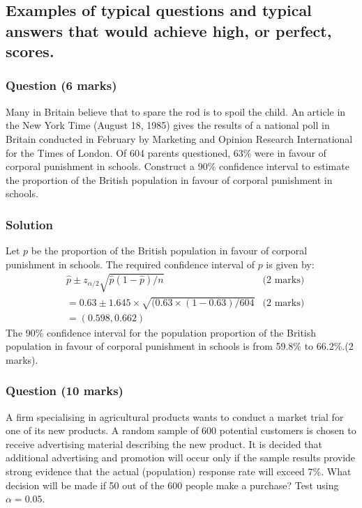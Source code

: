 \documentclass[a4paper,oneside]{book}
\begin{document}
\subsection*{Examples of typical questions and typical answers that
  would achieve high, or perfect, scores.}





\subsubsection*{Question (6 marks)}

Many in Britain believe that to spare the rod is to spoil the
child. An article in the New York Time (August 18, 1985) gives the
results of a national poll in Britain conducted in February by
Marketing and Opinion Research International for the Times of
London. Of 604 parents questioned, 63\% were in favour of corporal
punishment in schools. Construct a 90\% confidence interval to
estimate the proportion of the British population in favour of
corporal punishment in schools.

\subsubsection*{Solution}
Let $p$ be the proportion of the British population in favour of corporal punishment in
schools. The required confidence interval of $p$ is given by:
\begin{align*}
  & \hat{p} \pm z_{\alpha/2}\sqrt{\hat{p}(1-\hat{p})/n}  & \text{(2 marks)}\\
  & = 0.63\pm 1.645\times \sqrt{(0.63\times (1-0.63)/604}  & \text{(2 marks)}\\
  & = (0.598,0.662)
\end{align*}
The 90\% confidence interval for the population proportion of the British population in favour of
corporal punishment in schools is from 59.8\% to 66.2\%.\quad (2 marks).

\subsubsection*{Question (10 marks)}
A firm specialising in agricultural products wants to conduct a market
trial for one of its new products. A random sample of 600 potential
customers is chosen to receive advertising material describing the new
product. It is decided that additional advertising and promotion will
occur only if the sample results provide strong evidence that the
actual (population) response rate will exceed
7\%. What decision will be made if 50 out of the 600 people make a purchase? Test using $\alpha = 0.05$.
\end{document}
